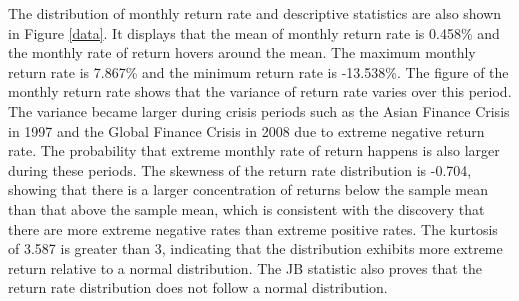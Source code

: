 \documentclass[11pt]{article}
\begin{document}
The distribution of monthly return rate and descriptive statistics are also shown in Figure \ref{data}. It displays that the mean of monthly return rate is 0.458\% and the monthly rate of return hovers around the mean. The maximum monthly return rate is 7.867\% and the minimum return rate is -13.538\%. The figure of the monthly return rate shows that the variance of return rate varies over this period. The variance became larger during crisis periods such as the Asian Finance Crisis in 1997 and the Global Finance Crisis in 2008 due to extreme negative return rate. The probability that extreme monthly rate of return happens is also larger during these periods. The skewness of the return rate distribution is -0.704, showing that there is a larger concentration of returns below the sample mean than that above the sample mean, which is consistent with the discovery that there are more extreme negative rates than extreme positive rates. The kurtosis of 3.587 is greater than 3, indicating that the distribution exhibits more extreme return relative to a normal distribution. The JB statistic also proves that the return rate distribution does not follow a normal distribution.
\end{document}
